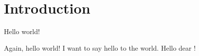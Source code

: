 \chapter{Introduction}

Hello world!

Again, hello world!
I want to say hello to the world.
Hello dear ! 
\blindtext[10]